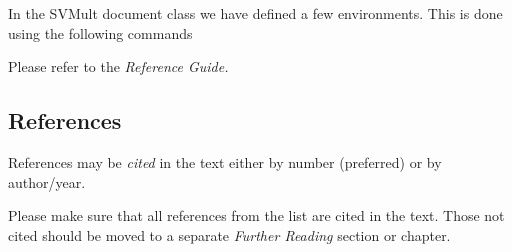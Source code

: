 \documentclass[graybox]{svmult}
\begin{document}
\begin{refguide}
\begin{sloppy}
In the {\sc SVMult} document class we have defined a few environments. This is done using the following commands

\cprotect{}

\noindent
Please refer to the {\it Reference Guide.}

\eject

\subsection{References}

References may be \emph{cited} in the text either by number (preferred) or by author/year. 

Please make sure that all references from the list are cited in the text. Those not cited should be moved to a separate \emph{Further Reading} section or chapter.


\end{sloppy}
\end{refguide}
\end{document}
